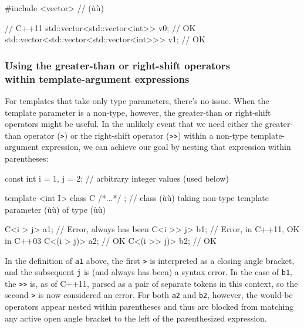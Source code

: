 \begin{emcppshiddenlisting}[emcppsbatch=e2]
#include <vector>  // (ù{}ù)
\end{emcppshiddenlisting}
\begin{emcppslisting}[emcppsbatch=e2]
// C++11
std::vector<std::vector<int>> v0;               // OK
std::vector<std::vector<std::vector<int>>> v1;  // OK
\end{emcppslisting}

\subsubsection[Using the greater-than or right-shift operators within template-argument expressions]{Using the greater-than or right-shift operators\\[0.5ex] within template-argument expressions}\label{using-the-greater-than-or-right-shift-operators-within-template-argument-expressions}

For templates that take only type parameters, there's no issue. When the
template parameter is a non-type, however, the greater-than or right-shift operators might be
useful. In the unlikely event that we need either the greater-than
operator (\lstinline!>!) or the right-shift operator (\lstinline!>>!) within a
non-type template-argument expression, we can achieve our goal by
nesting that expression within parentheses:

\begin{emcppslisting}
const int i = 1, j = 2;  // arbitrary integer values (used below)

template <int I> class C { /*...*/ };
    // class (ù{}ù) taking non-type template parameter (ù{}ù) of type (ù{}ù)

C<i > j>    a1;  // Error, always has been
C<i >> j>   b1;  // Error, in C++11, OK in C++03
C<(i > j)>  a2;  // OK
C<(i >> j)> b2;  // OK
\end{emcppslisting}


\noindent In the definition of \lstinline!a1! above, the first \lstinline!>! is
interpreted as a closing angle bracket, and the subsequent \lstinline!j! is
(and always has been) a syntax error. In the case of \lstinline!b1!, the
\lstinline!>>! is, as of C++11, parsed as a pair of separate tokens in this
context, so the second \lstinline!>! is now considered an error. For
both \lstinline!a2! and \lstinline!b2!, however, the would-be operators appear
nested within parentheses and thus are blocked from matching any
active open angle bracket to the left of the parenthesized expression.

